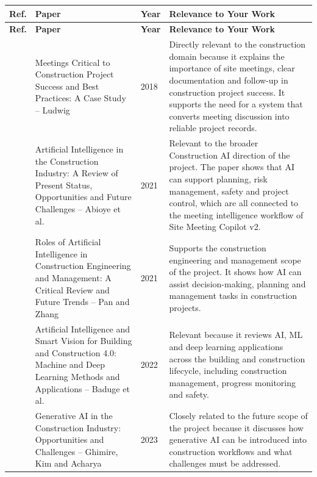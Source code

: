 \documentclass[11pt,a4paper]{article}
\begin{document}
\begingroup
\small
\renewcommand{\arraystretch}{1.16}
\setlength{\tabcolsep}{5pt}
\begin{longtable}{p{0.9cm}p{5.0cm}p{1.1cm}p{5.4cm}}
\toprule
\textbf{Ref.} & \textbf{Paper} & \textbf{Year} & \textbf{Relevance to Your Work} \\
\midrule
\endfirsthead

\toprule
\textbf{Ref.} & \textbf{Paper} & \textbf{Year} & \textbf{Relevance to Your Work} \\
\midrule
\endhead

\cite{constructionmeetings} & Meetings Critical to Construction Project Success and Best Practices: A Case Study -- Ludwig & 2018 & Directly relevant to the construction domain because it explains the importance of site meetings, clear documentation and follow-up in construction project success. It supports the need for a system that converts meeting discussion into reliable project records. \\

\cite{abioye} & Artificial Intelligence in the Construction Industry: A Review of Present Status, Opportunities and Future Challenges -- Abioye et al. & 2021 & Relevant to the broader Construction AI direction of the project. The paper shows that AI can support planning, risk management, safety and project control, which are all connected to the meeting intelligence workflow of Site Meeting Copilot v2. \\

\cite{pan2021} & Roles of Artificial Intelligence in Construction Engineering and Management: A Critical Review and Future Trends -- Pan and Zhang & 2021 & Supports the construction engineering and management scope of the project. It shows how AI can assist decision-making, planning and management tasks in construction projects. \\

\cite{baduge2022} & Artificial Intelligence and Smart Vision for Building and Construction 4.0: Machine and Deep Learning Methods and Applications -- Baduge et al. & 2022 & Relevant because it reviews AI, ML and deep learning applications across the building and construction lifecycle, including construction management, progress monitoring and safety. \\

\cite{ghimire2023} & Generative AI in the Construction Industry: Opportunities and Challenges -- Ghimire, Kim and Acharya & 2023 & Closely related to the future scope of the project because it discusses how generative AI can be introduced into construction workflows and what challenges must be addressed. \\


\end{longtable}
\end{document}
